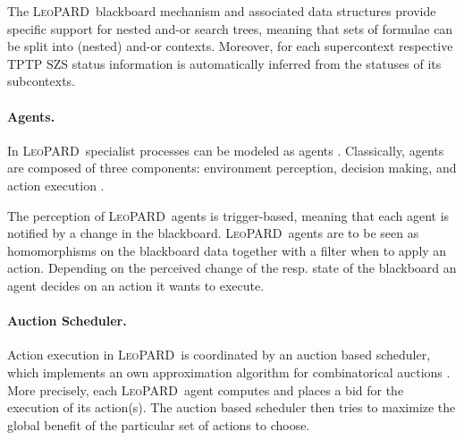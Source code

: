 \documentclass{llncs}
\def\sys{\mbox{\textsc{LeoPARD}}}
\begin{document}
The \sys\ blackboard mechanism and associated data structures provide
specific support for nested and-or search trees, meaning that sets of formulae
can be split into (nested) and-or contexts. Moreover, for each
supercontext respective TPTP SZS status \cite{DBLP:journals/jar/Sutcliffe09}  information is automatically
inferred from the statuses of its subcontexts.

\paragraph{Agents.}
In \sys\ specialist processes can be modeled as agents  \cite{WisniewskiMSc}.
Classically, agents are composed of three
components: environment perception, decision making, and action
execution  \cite{weiss:mas}. %

The perception of \sys\ agents is trigger-based, meaning that each
agent is notified by a change in the blackboard. \sys\ agents are to
be seen as homomorphisms on the blackboard data together with a filter
when to apply an action. 
Depending on the perceived change of the resp. state of the blackboard an
agent decides on an action it wants to execute.

\paragraph{Auction Scheduler.} Action execution in \sys\ is
coordinated by an auction based scheduler, %
which implements an own approximation algorithm \cite{WisniewskiMSc}
for combinatorical auctions \cite{arrow}.
More precisely, each \sys\
agent computes and places a bid for the execution of its action(s).  The
auction based scheduler then tries to maximize the global benefit of the
particular set of actions to choose.  %
\end{document}
